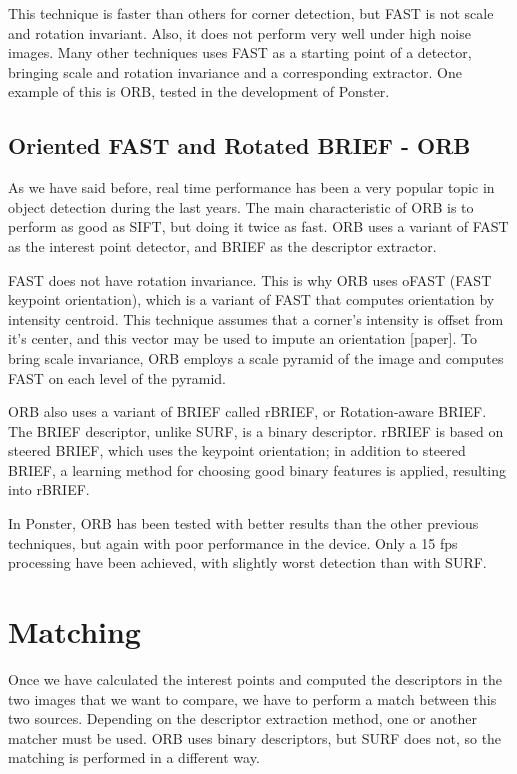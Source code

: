 This technique is faster than others for corner detection, but FAST is not
scale and rotation invariant. Also, it does not perform very well under high
noise images. Many other techniques uses FAST as a starting point of a
detector, bringing scale and rotation invariance and a corresponding
extractor. One example of this is ORB, tested in the development of Ponster.

\subsection{Oriented FAST and Rotated BRIEF - ORB}
As we have said before, real time performance has been a very popular topic in
object detection during the last years. The main characteristic of ORB is to
perform as good as SIFT, but doing it twice as fast. ORB uses a variant of FAST
as the interest point detector, and BRIEF as the descriptor extractor. 

FAST does not have rotation invariance. This is why ORB uses oFAST (FAST
keypoint orientation), which is a variant of FAST that computes orientation by
intensity centroid. This technique assumes that a corner's intensity is offset
from it's center, and this vector may be used to impute an orientation
[paper]. To bring scale invariance, ORB employs a scale pyramid of the image
and computes FAST on each level of the pyramid.

ORB also uses a variant of BRIEF called rBRIEF, or Rotation-aware BRIEF. The
BRIEF descriptor, unlike SURF, is a binary descriptor. rBRIEF is based on
steered BRIEF, which uses the keypoint orientation; in addition to steered
BRIEF, a learning method for choosing good binary features is applied,
resulting into rBRIEF.

In Ponster, ORB has been tested with better results than the other previous
techniques, but again with poor performance in the device. Only a 15 fps
processing have been achieved, with slightly worst detection than with SURF.

\section{Matching}
Once we have calculated the interest points and computed the descriptors in the
two images that we want to compare, we have to perform a match between this two
sources. Depending on the descriptor extraction method, one or another matcher
must be used. ORB uses binary descriptors, but SURF does not, so the matching
is performed in a different way.

